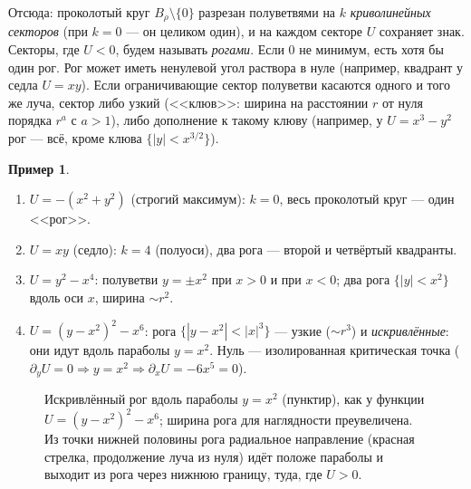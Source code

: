 \documentclass[11pt,a4paper]{article}
\theoremstyle{definition}
\newtheorem{example}[theorem]{Пример}
\newcommand{\term}[1]{\emph{#1}}
\begin{document}
Отсюда: проколотый круг $B_\rho\setminus\{0\}$ разрезан полуветвями на $k$ \term{криволинейных
секторов} (при $k=0$ --- он целиком один), и на каждом секторе $U$ сохраняет знак. Секторы, где
$U<0$, будем называть \term{рогами}. Если $0$ не минимум, есть хотя бы один рог. Рог может иметь
ненулевой угол раствора в нуле (например, квадрант у седла $U=xy$). Если ограничивающие сектор
полуветви касаются одного и того же луча, сектор либо узкий (<<клюв>>: ширина на расстоянии $r$
от нуля порядка $r^a$ с $a>1$), либо дополнение к такому клюву (например, у $U=x^3-y^2$ рог ---
всё, кроме клюва $\{|y|<x^{3/2}\}$).

\begin{example}\label{ex:horns}
\begin{enumerate}[leftmargin=*]
\item $U=-(x^2+y^2)$ (строгий максимум): $k=0$, весь проколотый круг --- один <<рог>>.
\item $U=xy$ (седло): $k=4$ (полуоси), два рога --- второй и четвёртый квадранты.
\item $U=y^2-x^4$: полуветви $y=\pm x^2$ при $x>0$ и при $x<0$; два рога $\{|y|<x^2\}$
вдоль оси $x$, ширина $\sim r^2$.
\item $U=(y-x^2)^2-x^6$: рога $\{|y-x^2|<|x|^3\}$ --- узкие ($\sim r^3$) и \emph{искривлённые}:
они идут вдоль параболы $y=x^2$. Нуль --- изолированная критическая точка
($\partial_yU=0\Rightarrow y=x^2\Rightarrow\partial_xU=-6x^5=0$).
\end{enumerate}
\end{example}

\begin{figure}[ht]
\centering
{}
\caption{Искривлённый рог вдоль параболы $y=x^2$ (пунктир), как у функции $U=(y-x^2)^2-x^6$;
ширина рога для наглядности преувеличена. Из точки нижней половины рога радиальное направление
(красная стрелка, продолжение луча из нуля) идёт положе параболы и выходит из рога через нижнюю
границу, туда, где $U>0$.}
\label{fig:horn}
\end{figure}
\end{document}
